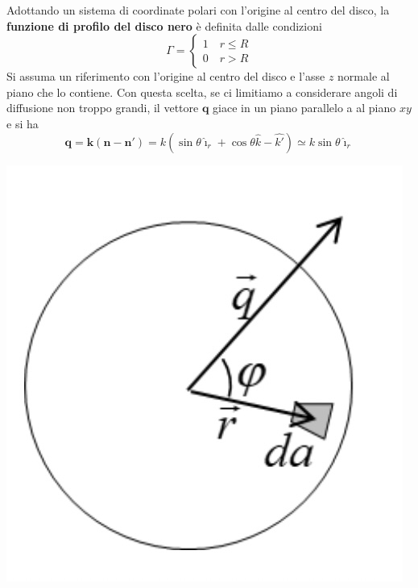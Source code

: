 Adottando un sistema di coordinate polari con l'origine al centro del
disco, la \textbf{funzione di profilo del disco nero} è definita dalle
condizioni
\[
	\Gamma  =
	\begin{cases}
		1  \quad r \leq R \\
		0  \quad r > R
	\end{cases}
\]
Si assuma un riferimento con l'origine al centro del disco e l'asse $z$ normale al piano che lo contiene.
Con questa scelta, se ci limitiamo a considerare angoli di diffusione non troppo grandi, il vettore $\bm{q}$ giace in un piano parallelo a al piano $xy$ e si ha \[
	\bm{q} = \bm{k} ( \bm{n} - \bm{n}') = k ( \sin \theta \hat{\imath}_r + \cos \theta \hat{k} - \hat{k'}) \simeq
	k \sin \theta \hat{\imath}_r
\]

\begin{marginfigure}
	\centering
	\includegraphics{figs/schema-vett-trasferito-2}
	\label{fig:vett-trasferito2}
\end{marginfigure}

